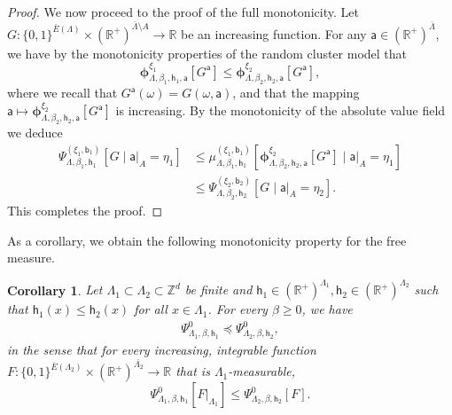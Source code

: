 \documentclass[11pt,a4paper]{article}
\newtheorem{corollary}[theorem]{Corollary}
\theoremstyle{definition}
\numberwithin{equation}{section}
\begin{document}
\begin{proof}
We now proceed to the proof of the full monotonicity. Let $G:\{0,1\}^{\overline{E}(\Lambda)}\times(\mathbb{R}^{+})^{\overline{\Lambda}\setminus A}\to \mathbb{R}$ be an increasing function. For any $\mathsf{a} \in (\mathbb{R}^{+})^{\overline{\Lambda}}$, we have by the monotonicity properties of the random cluster model that
\begin{equation}
\boldsymbol{\phi}^{\xi_1}_{\Lambda,\beta_1,\mathsf h_1,\mathsf{a}}[G^{\mathsf{a}}]
\leq
\boldsymbol{\phi}^{\xi_2}_{\Lambda,\beta_2,\mathsf h_2,\mathsf{a}}[G^{\mathsf{a}}],
\end{equation}
where we recall that $G^{\mathsf{a}}(\omega)=G(\omega,\mathsf{a})$,
and that the mapping $\mathsf{a} \mapsto \boldsymbol{\phi}^{\xi_2}_{\Lambda,\beta_2,\mathsf h_2,\mathsf{a}}[G^{\mathsf{a}}]$ is increasing.
By the monotonicity of the absolute value field we deduce
\begin{equation}
\begin{aligned}
\Psi_{\Lambda,\beta_1,\mathsf h_1}^{(\xi_1,\mathsf{b}_1)}[G\mid \mathsf{a}|_A=\eta_1]
&\leq 
\mu_{\Lambda,\beta_1,\mathsf h_1}^{(\xi_1,\mathsf{b}_1)}[\boldsymbol{\phi}^{\xi_2}_{\Lambda,\beta_2,\mathsf h_2,\mathsf{a}}[G^{\mathsf{a}}]\mid \mathsf{a}|_A=\eta_1]\\
&\leq
\Psi_{\Lambda,\beta_2,\mathsf h_2}^{(\xi_2,\mathsf{b}_2)}[G\mid \mathsf{a}|_A=\eta_2].
\end{aligned}
\end{equation}
This completes the proof.
\end{proof}


As a corollary, we obtain the following monotonicity property for the free measure.

\begin{corollary}\label{cor: monotonicity free measure}
Let $\Lambda_1\subset \Lambda_2\subset \mathbb{Z}^d$ be finite and $\mathsf h_1\in (\mathbb{R}^+)^{\Lambda_1},\mathsf h_2\in (\mathbb{R}^+)^{\Lambda_2}$ such that $\mathsf h_1(x)\leq \mathsf h_2(x)$ for all $x\in \Lambda_1$. For every $\beta\geq 0$, we have
\begin{align}
\Psi_{\Lambda_1,\beta,\mathsf{h}_1}^{0} \preccurlyeq \Psi_{\Lambda_2,\beta,\mathsf{h}_2}^{0},
\end{align}    
in the sense that for every increasing, integrable function $F:\{0,1\}^{\overline{E}(\Lambda_2)}\times(\mathbb R^+)^{\overline{\Lambda_2}}\to \mathbb{R}$ that is $\Lambda_1$-measurable,
\begin{equation}
\Psi^0_{\Lambda_1,\beta,\mathsf h_1}[F|_{\Lambda_1}] \leq \Psi^0_{\Lambda_2,\beta, \mathsf h_2}[F].
\end{equation}
\end{corollary}
\end{document}
